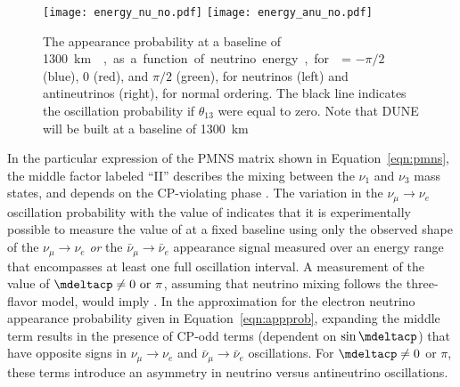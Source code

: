 \begin{figure}
  \centering
\texttt{[image: energy\_nu\_no.pdf]}
\texttt{[image: energy\_anu\_no.pdf]}
  \caption[Appearance probabilities for \nue and \anue at \SI{1300}{\km}]{The appearance probability at a baseline of \SI{1300}\km{},
  as a function of neutrino energy, for \deltacp = $-\pi/2$ (blue), 
  0 (red), and $\pi/2$ (green), for neutrinos (left) and antineutrinos
  (right), for normal ordering. The black line indicates the oscillation
  probability if $\theta_{13}$ were equal to zero. Note that DUNE will be built at a baseline of \SI{1300}{\km}}
  \label{fig:oscprob}
\end{figure}

In the particular expression of the PMNS matrix shown in
Equation~\ref{eqn:pmns}, the middle factor labeled ``II'' describes
the mixing between the $\nu_1$ and $\nu_3$ mass states, and depends on
the CP-violating phase \deltacp. The variation in the $\nu_\mu \rightarrow
\nu_e$ oscillation probability with the value of \deltacp
indicates that it is experimentally possible to measure the value of
\deltacp at a fixed baseline using only the observed shape of the
$\nu_\mu \rightarrow \nu_e$ {\em or} the 
$\bar{\nu}_\mu \rightarrow \bar{\nu}_e$
appearance signal measured over an energy range that encompasses at
least one full oscillation interval. A measurement of the value of
$\mdeltacp \neq 0 \ {\rm or} \ \pi$, assuming that neutrino mixing follows the three-flavor model, would imply . In the approximation for the electron neutrino appearance
probability given in Equation~\ref{eqn:appprob}, expanding the middle
term results in the presence of CP-odd terms (dependent on $\sin
\mdeltacp$) that have opposite signs in $\nu_{\mu} \rightarrow \nu_e$
and $\bar{\nu}_{\mu} \rightarrow \bar{\nu}_e$ oscillations.
For $\mdeltacp \neq 0$ or $\pi$, these terms introduce an asymmetry in
neutrino versus antineutrino oscillations. 
